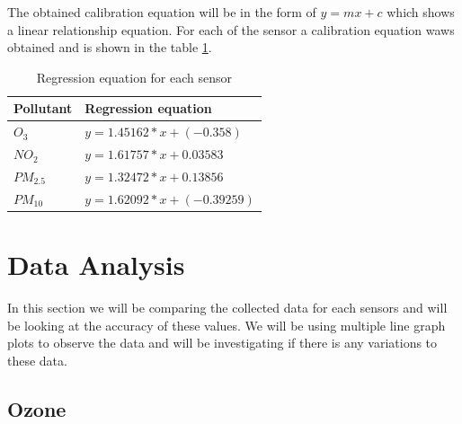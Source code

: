 The obtained calibration equation will be in the form of $ y = mx + c $ which shows a linear relationship equation. For each of the sensor a calibration equation waws obtained and is shown in the table \ref{tableequation}.
\begingroup
\setlength{\tabcolsep}{10pt} %
\renewcommand{\arraystretch}{1.5} %
\begin{table}[h]
  
  
  \begin{tabularx}{\columnwidth}{X|X}
      \hline
      Pollutant          & Regression equation    \\
      \hline
  
   
    
    




    
    $O_{3}$   & $y = 1.45162 * x + (-0.358)$ \\ 
    $NO_{2}$   & $y = 1.61757 * x + 0.03583$\\ 
    $PM_{2.5}$   & $y = 1.32472 * x + 0.13856$ \\ 
    $PM_{10}$   & $y = 1.62092 * x + (-0.39259)$\\ \hline
  
   
      
    
\end{tabularx}
 
  \caption{Regression equation for each sensor}
  \label{tableequation}
\end{table}
\endgroup
  \section{Data Analysis}
  In this section we will be comparing the collected data for each sensors and will be looking at the accuracy of these values. We will be using multiple line graph plots to observe the data and will be investigating if there is any variations to these data.
  
  \subsection{Ozone}

